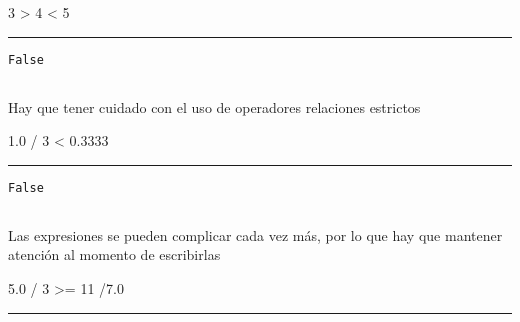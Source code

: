 \documentclass[]{article}
\newenvironment{Shaded}{}{}
\newcommand{\DecValTok}[1]{\textcolor[rgb]{0.25,0.63,0.44}{#1}}
\newcommand{\FloatTok}[1]{\textcolor[rgb]{0.25,0.63,0.44}{#1}}
\newcommand{\OperatorTok}[1]{\textcolor[rgb]{0.40,0.40,0.40}{#1}}
\begin{document}
\begin{Shaded}
\begin{Highlighting}[]
\DecValTok{3} \OperatorTok{>} \DecValTok{4} \OperatorTok{<} \DecValTok{5}
\end{Highlighting}
\end{Shaded}

\begin{center}\rule{0.5\linewidth}{\linethickness}\end{center}

\begin{verbatim}
False
\end{verbatim}

\subsection{}\label{section-2}

Hay que tener cuidado con el uso de operadores relaciones estrictos

\begin{Shaded}
\begin{Highlighting}[]
\FloatTok{1.0} \OperatorTok{/} \DecValTok{3} \OperatorTok{<} \FloatTok{0.3333}
\end{Highlighting}
\end{Shaded}

\begin{center}\rule{0.5\linewidth}{\linethickness}\end{center}

\begin{verbatim}
False
\end{verbatim}

\subsection{}\label{section-3}

Las expresiones se pueden complicar cada vez más, por lo que hay que
mantener atención al momento de escribirlas

\begin{Shaded}
\begin{Highlighting}[]
\FloatTok{5.0} \OperatorTok{/} \DecValTok{3} \OperatorTok{>=} \DecValTok{11} \OperatorTok{/}\FloatTok{7.0}
\end{Highlighting}
\end{Shaded}

\begin{center}\rule{0.5\linewidth}{\linethickness}\end{center}
\end{document}
